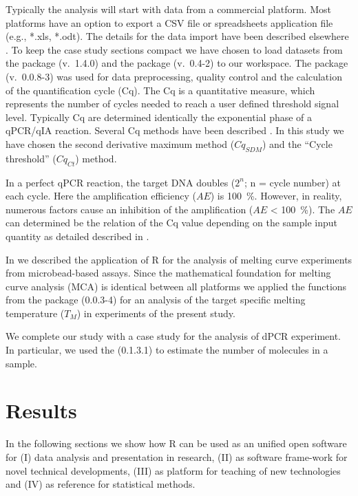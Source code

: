 Typically the analysis will start with data from a commercial platform. 
Most platforms have an option to export a CSV file or spreadsheets application 
file (e.g., *.xls, *.odt). The details for the data import have been described 
elsewhere \citep{RDCT2010c, rodiger_rkward_2012}. To keep the case study 
sections compact we have chosen to load datasets from the  package 
\citep{ritz_2008, spiess_2008} (v.~1.4.0) and the  package (v.~0.4-2) to our 
workspace. The  package (v.~0.0.8-3) was used 
for data preprocessing, quality control and  the calculation of the 
quantification cycle (Cq). The Cq is a quantitative measure, which represents 
the number of cycles needed to reach a user defined threshold signal level. 
Typically Cq are determined identically the exponential phase of a qPCR/qIA 
reaction. Several Cq methods have been described \citep{ruijter_2013}. In this 
study we have chosen the second derivative maximum method ($Cq_{SDM}$) and the 
``Cycle threshold'' ($Cq_{Ct}$) method.

In a perfect qPCR reaction, the target DNA doubles ($2^{n}$; n = cycle 
number) at each cycle. Here the amplification efficiency ($AE$) is 100~\%. 
However, in reality, numerous factors cause an inhibition of the amplification 
($AE$ < 100~\%).  The $AE$ can determined be the relation of the Cq value 
depending on the sample input quantity as detailed described in 
\citet{roediger_chippcr_2014}.

In \citet{roediger_RJ_2013} we described the application of R for the analysis 
of melting curve experiments from microbead-based assays. Since the mathematical 
foundation for melting curve analysis (MCA) is identical between all platforms 
we applied the functions from the  package (0.0.3-4) for an 
analysis of the target specific melting temperature ($T_{M}$) in experiments of 
the present study.

We complete our study with a case study for the analysis of dPCR 
experiment. In particular, we used the  (0.1.3.1) to estimate the 
number of molecules in a sample.

\section{Results}

In the following sections we show how R can be used as an unified open 
software for (I) data analysis and presentation in research, 
(II) as software frame-work for novel technical developments, (III) as platform 
for teaching of new technologies and (IV) as reference for statistical methods.

